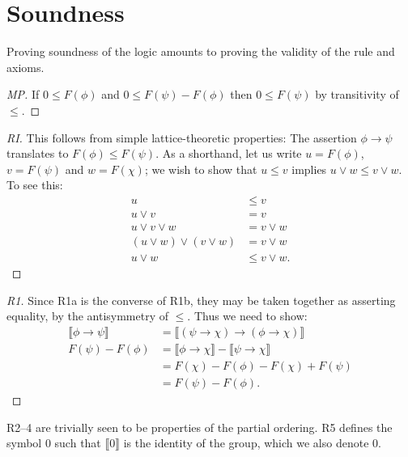 \documentclass[journal,draftcls,onecolumn]{IEEEtran}
\theoremstyle{definition}
\newcommand{\interp}[1]{\llbracket #1 \rrbracket}
\begin{document}
\section{Soundness}

Proving soundness of the logic amounts to proving the validity of the
rule and axioms.


\begin{proof}[MP]
If $0 \le F(\phi)$ and $0 \le F(\psi) - F(\phi)$ then
$0 \le F(\psi)$ by transitivity of $\le$.
\end{proof}

\begin{proof}[RI]
  This follows from simple lattice-theoretic properties: The assertion
  $\phi \rightarrow \psi$ translates to $F(\phi) \le F(\psi)$. As a
  shorthand, let us write $u = F(\phi)$, $v = F(\psi)$ and $w =
  F(\chi)$; we wish to show that $u\le v$ implies $u\lor w \le v \lor
  w$. To see this:
  \begin{align*}
    u &\le v\\
    u\lor v &= v\\
    u\lor v\lor w &= v\lor w\\
    (u\lor w)\lor (v\lor w) &= v\lor w\\
    u\lor w &\le v\lor w.
  \end{align*}
\end{proof}

\begin{proof}[R1]
  Since R1a is the converse of R1b, they may be taken together as
  asserting equality, by the antisymmetry of $\le$. Thus we need to
  show:
  \begin{align*}
    \interp{\phi \rightarrow \psi} & = \interp{(\psi \rightarrow
      \chi) \rightarrow (\phi \rightarrow \chi)}\\
    F(\psi) - F(\phi) & = \interp{\phi \rightarrow \chi} -
    \interp{\psi \rightarrow \chi}\\
    & = F(\chi) - F(\phi) - F(\chi) + F(\psi)\\
    & = F(\psi) - F(\phi).
  \end{align*}
\end{proof}
R2--4 are trivially seen to be properties of the partial ordering. R5
defines the symbol 0 such that $\interp{0}$ is the identity of the
group, which we also denote 0.
\end{document}
